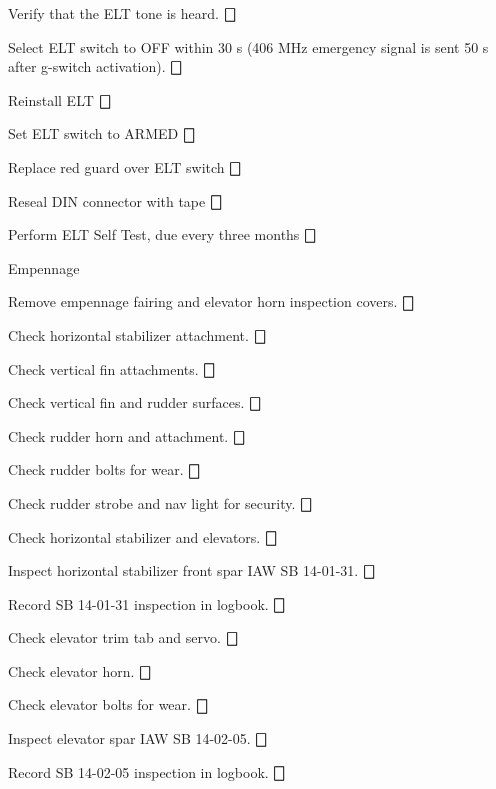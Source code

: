 \begin{enumerate*}
\begin{enumerate*}
\begin{enumerate*}
\begin{enumerate*}
  		  \end{enumerate*} 
  		\item Verify that the ELT tone is heard. \dotfill $\bigbox$
  		\item Select ELT switch to OFF within 30 s (406 MHz emergency signal is sent 50 s after g-switch activation). \dotfill $\bigbox$
  	\end{enumerate*}
  	\item Reinstall ELT \dotfill $\bigbox$
  	\item Set ELT switch to ARMED \dotfill $\bigbox$
  	\item Replace red guard over ELT switch \dotfill $\bigbox$
  	\item Reseal DIN connector with tape \dotfill $\bigbox$
  	\item Perform ELT Self Test, due every three months \dotfill $\bigbox$
  \end{enumerate*}
	\item{Empennage} 
	\begin{enumerate*}
		\item Remove empennage fairing and elevator horn inspection covers. \dotfill $\bigbox$
		\item Check horizontal stabilizer attachment. \dotfill $\bigbox$
		\item Check vertical fin attachments. \dotfill $\bigbox$
		\item Check vertical fin and rudder surfaces. \dotfill $\bigbox$
		\item Check rudder horn and attachment. \dotfill $\bigbox$
		\item Check rudder bolts for wear. \dotfill $\bigbox$
		\item Check rudder strobe and nav light for security. \dotfill $\bigbox$
		\item Check horizontal stabilizer and elevators. \dotfill $\bigbox$
		\item Inspect horizontal stabilizer front spar IAW SB 14-01-31. \dotfill $\bigbox$
		\item Record SB 14-01-31 inspection in logbook. \dotfill $\bigbox$
		\item Check elevator trim tab and servo. \dotfill $\bigbox$
		\item Check elevator horn. \dotfill $\bigbox$
		\item Check elevator bolts for wear. \dotfill $\bigbox$
		\item Inspect elevator spar IAW SB 14-02-05. \dotfill $\bigbox$
		\item Record SB 14-02-05 inspection in logbook. \dotfill $\bigbox$

\end{enumerate*}
\end{enumerate*}
